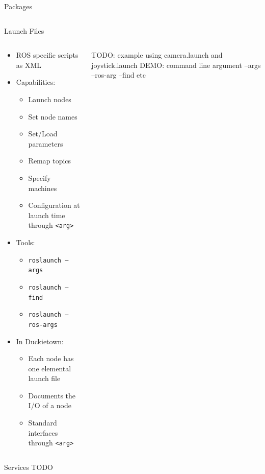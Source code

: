 \documentclass{beamer}
\newcommand{\inline}[1]{\texttt{#1}}
\begin{document}
\begin{frame}{Packages}
\begin{columns}
\begin{column}{0.4\textwidth}
	\end{column}
\end{columns}
\end{frame}


\begin{frame}{Launch Files}
	\begin{columns}
		\begin{column}{0.6\textwidth}
			\begin{itemize}
				\item ROS specific scripts as XML
				\item Capabilities:
					\begin{itemize}
						\item Launch nodes
						\item Set node names
						\item Set/Load parameters
						\item Remap topics
						\item Specify machines
						\item Configuration at launch time through \inline{<arg>}
					\end{itemize}
				\item Tools:
					\begin{itemize}
						\item \inline{roslaunch --args}
						\item \inline{roslaunch --find}
						\item \inline{roslaunch --ros-args}
					\end{itemize}
				\item In Duckietown:
					\begin{itemize}
						\item Each node has one elemental launch file
						\item Documents the I/O of a node
						\item Standard interfaces through \inline{<arg>}
					\end{itemize}
			\end{itemize}
		\end{column}
	\begin{column}{0.4\textwidth}
		\centering
		TODO: example using camera.launch and joystick.launch
		DEMO: command line argument --args --ros-arg --find etc
		\end{column}
	\end{columns}
\end{frame}

\begin{frame}{Services}
	TODO
\end{frame}
\end{document}
